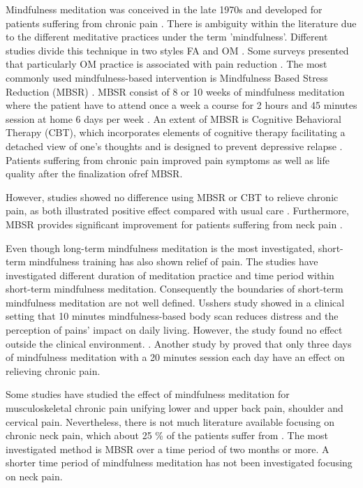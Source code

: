 Mindfulness meditation was conceived in the late 1970s and developed for patients suffering from chronic pain \cite{Chiesa2010}. There is ambiguity within the literature due to the different meditative practices under the term 'mindfulness'. Different studies divide this technique in two styles FA and OM \cite{Lutz2008,Zeidan2012}. Some surveys presented that particularly OM practice is associated with pain reduction \cite{Grant2009,Perlman2010}. The most commonly used mindfulness-based intervention is Mindfulness Based Stress Reduction (MBSR) \cite{Cramer2012}. MBSR consist of 8 or 10 weeks of mindfulness meditation where the patient have to attend once a week a course for 2 hours and 45 minutes session at home 6 days per week \cite{Kabat1982, Chiesa2010}. An extent of MBSR is Cognitive Behavioral Therapy (CBT), which incorporates elements of cognitive therapy facilitating a detached view of one's thoughts and is designed to prevent depressive relapse \cite{Chiesa2010}. Patients suffering from chronic pain improved pain symptoms as well as life quality after the finalization ofref MBSR. \cite{Zeidan2012} 

However, studies showed no difference using MBSR or CBT to relieve chronic pain, as both illustrated positive effect compared with usual care \cite{Jacob2016,Cherkin2016}. Furthermore, MBSR provides significant improvement for patients suffering from neck pain \cite{Rosenzweig2010}.

Even though long-term mindfulness meditation is the most investigated, short-term mindfulness training has also shown relief of pain. The studies have investigated different duration of meditation practice and time period within short-term mindfulness meditation. Consequently the boundaries of short-term mindfulness meditation are not well defined. Usshers study \cite{Ussher2012} showed in a clinical setting that 10 minutes mindfulness-based body scan reduces distress and the perception of pains’ impact on daily living. However, the study found no effect outside the clinical environment. \cite{Ussher2012}. Another study by \cite{Zeidan2012} proved that only three days of mindfulness meditation with a 20 minutes session each day have an effect on relieving chronic pain. 

Some studies have studied the effect of mindfulness meditation for musculoskeletal chronic pain unifying lower and upper back pain, shoulder and cervical pain.\cite{Chiesa2010} Nevertheless, there is not much literature available focusing on chronic neck pain, which about 25 \% of the patients suffer from \cite{Macfarlanea2016}. The most investigated method is MBSR over a time period of two months or more. A shorter time period of mindfulness meditation has not been investigated focusing on neck pain.

